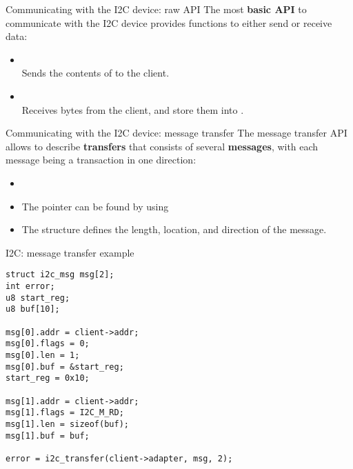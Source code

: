 \begin{frame}{Communicating with the I2C device: raw API}
  The most {\bf basic API} to communicate with the I2C device provides
  functions to either send or receive data:
  \begin{itemize}
  \item
    \\Sends
    the contents of  to the client.
  \item
    \\Receives
     bytes from the client, and store them into
    .
  \end{itemize}
\end{frame}

\begin{frame}{{\large Communicating with the I2C device: message transfer}}
  The message transfer API allows to describe {\bf transfers} that
  consists of several {\bf messages}, with each message being a
  transaction in one direction:
  \begin{itemize}
  \item
  \item The  pointer can be found by using
  \item The  structure defines the length, location, and
    direction of the message.
  \end{itemize}
\end{frame}

\begin{frame}[fragile]{I2C: message transfer example}
\begin{block}{}
  \begin{verbatim}
struct i2c_msg msg[2];
int error;
u8 start_reg;
u8 buf[10];

msg[0].addr = client->addr;
msg[0].flags = 0;
msg[0].len = 1;
msg[0].buf = &start_reg;
start_reg = 0x10;

msg[1].addr = client->addr;
msg[1].flags = I2C_M_RD;
msg[1].len = sizeof(buf);
msg[1].buf = buf;

error = i2c_transfer(client->adapter, msg, 2);
\end{verbatim}
\end{block}
\end{frame}

